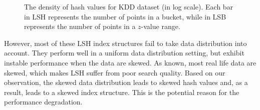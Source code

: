 \begin{figure}[!t]
\vspace{-0.1in}
	\centerline{
    }
	\caption{The density of hash values for KDD dataset (in log scale). Each bar in LSH represents the number of points in a bucket, while in LSB represents the number of points in a $z$-value range.}
	\label{fig:densitydist}
\vspace{-0.in}
\end{figure}


However, most of these LSH index structures fail to take data distribution into account. They perform well in a uniform data distribution setting, but exhibit instable performance when the data are skewed. As known, most real life data are skewed, which makes LSH suffer from poor search quality. Based on our observation, the skewed data distribution leads to skewed hash values and, as a result, leads to a skewed index structure. This is the potential reason for the performance degradation.

